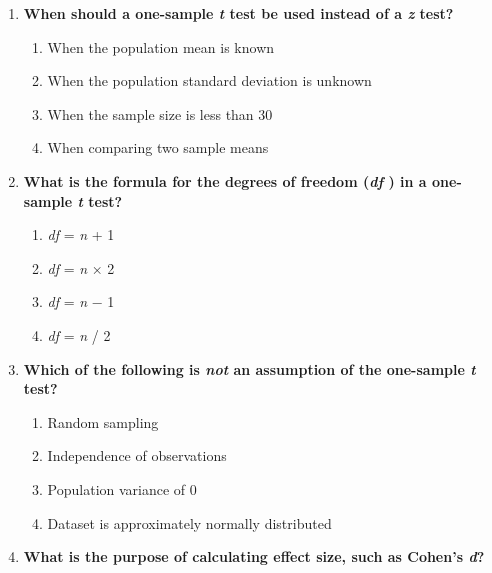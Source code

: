 \documentclass[
  letterpaper,
  DIV=11,
  numbers=noendperiod]{scrreprt}
\providecommand{\tightlist}{%
  \setlength{\itemsep}{0pt}\setlength{\parskip}{0pt}}
\begin{document}

\begin{enumerate}
\def\labelenumi{\arabic{enumi}.}
\item
  \textbf{When should a one-sample \emph{t} test be used instead of a
  \emph{z} test?}

  \begin{enumerate}
  \def\labelenumii{\alph{enumii}.}
  \tightlist
  \item
    When the population mean is known\\
  \item
    When the population standard deviation is unknown\\
  \item
    When the sample size is less than 30\\
  \item
    When comparing two sample means
  \end{enumerate}
\item
  \textbf{What is the formula for the degrees of freedom (\emph{df} ) in
  a one-sample \emph{t} test?}

  \begin{enumerate}
  \def\labelenumii{\alph{enumii}.}
  \tightlist
  \item
    \emph{df} = \emph{n} + 1\\
  \item
    \emph{df} = \emph{n} × 2\\
  \item
    \emph{df} = \emph{n} − 1\\
  \item
    \emph{df} = \emph{n} / 2
  \end{enumerate}
\item
  \textbf{Which of the following is \emph{not} an assumption of the
  one-sample \emph{t} test?}

  \begin{enumerate}
  \def\labelenumii{\alph{enumii}.}
  \tightlist
  \item
    Random sampling\\
  \item
    Independence of observations\\
  \item
    Population variance of 0\\
  \item
    Dataset is approximately normally distributed
  \end{enumerate}
\item
  \textbf{What is the purpose of calculating effect size, such as
  Cohen's \emph{d}?}


\end{enumerate}
\end{document}
